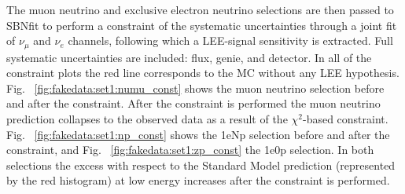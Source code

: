 The muon neutrino and exclusive electron neutrino selections are then passed to SBNfit to perform a constraint of the systematic uncertainties through a joint fit of $\nu_{\mu}$ and $\nu_e$ channels, following which a LEE-signal sensitivity is extracted.  Full systematic uncertainties are included: flux, genie, and detector.  In all of the constraint plots the red line corresponds to the MC without any LEE hypothesis. 
Fig. ~\ref{fig:fakedata:set1:numu_const} shows the muon neutrino selection before and after the constraint. After the constraint is performed the muon neutrino prediction collapses to the observed data as a result of the $\chi^2$-based constraint.
Fig. ~\ref{fig:fakedata:set1:np_const} shows the 1eNp selection before and after the constraint, and Fig. ~\ref{fig:fakedata:set1:zp_const} the 1e0p selection.  In both selections the excess with respect to the Standard Model prediction (represented by the red histogram) at low energy increases after the constraint is performed.    
